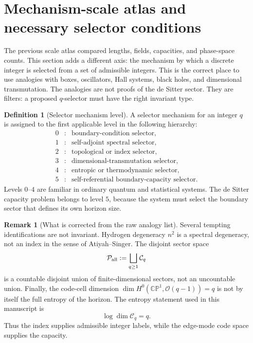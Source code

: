 \documentclass[aps,prd,reprint,nofootinbib,superscriptaddress,floatfix]{revtex4-2}
\numberwithin{equation}{section}
\theoremstyle{definition}
\newtheorem{definition}{Definition}[section]
\newtheorem{remark}{Remark}[section]
\theoremstyle{plain}
\newcommand{\CP}{\mathbb{CP}}
\begin{document}
\section{Mechanism-scale atlas and necessary selector conditions}
\label{sec:mechanism-scale-atlas}

The previous scale atlas compared lengths, fields, capacities, and phase-space
counts.  This section adds a different axis: the mechanism by which a discrete
integer is selected from a set of admissible integers.  This is the correct
place to use analogies with boxes, oscillators, Hall systems, black holes, and
dimensional transmutation.  The analogies are not proofs of the de Sitter
sector.  They are filters: a proposed \(q\)-selector must have the right
invariant type.

\begin{definition}[Selector mechanism level]
A selector mechanism for an integer \(q\) is assigned to the first applicable
level in the following hierarchy:
\[
\begin{array}{ccl}
0&:&\text{boundary-condition selector},\\
1&:&\text{self-adjoint spectral selector},\\
2&:&\text{topological or index selector},\\
3&:&\text{dimensional-transmutation selector},\\
4&:&\text{entropic or thermodynamic selector},\\
5&:&\text{self-referential boundary-capacity selector}.
\end{array}
\]
Levels \(0\)--\(4\) are familiar in ordinary quantum and statistical systems.
The de Sitter capacity problem belongs to level \(5\), because the system must
select the boundary sector that defines its own horizon size.
\end{definition}

\begin{remark}[What is corrected from the raw analogy list]
Several tempting identifications are not invariant.  Hydrogen degeneracy
\(n^2\) is a spectral degeneracy, not an index in the sense of
Atiyah--Singer.  The disjoint sector space
\[
\mathcal P_{\rm all}:=\bigsqcup_{q\ge1}\mathcal C_q
\]
is a countable disjoint union of finite-dimensional sectors, not an uncountable
union.  Finally, the code-cell dimension
\(\dim H^0(\CP^1,\mathcal O(q-1))=q\) is not by itself the full entropy of the
horizon.  The entropy statement used in this manuscript is
\[
\log\dim\mathcal C_q=q.
\]
Thus the index supplies admissible integer labels, while the edge-mode code
space supplies the capacity.
\end{remark}
\end{document}
